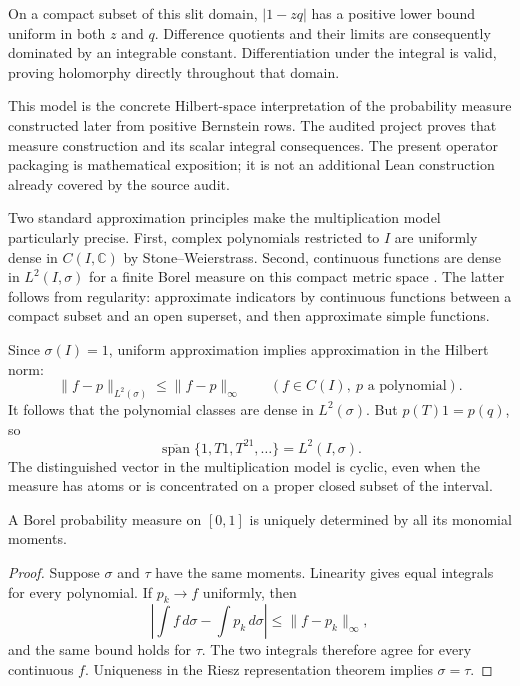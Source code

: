 On a compact subset of this slit domain, $|1-zq|$ has a
positive lower bound uniform in both $z$ and $q$. Difference
quotients and their limits are consequently dominated by an
integrable constant. Differentiation under the integral is valid,
proving holomorphy directly throughout that domain.

This model is the concrete Hilbert-space interpretation of the
probability measure constructed later from positive Bernstein rows.
The audited project proves that measure construction and its scalar
integral consequences. The present operator packaging is mathematical
exposition; it is not an additional Lean construction already covered
by the source audit.

\label{hilb:density}
Two standard approximation principles make the multiplication model
particularly precise. First, complex polynomials restricted to $I$
are uniformly dense in $C(I,\mathbb C)$ by Stone--Weierstrass.
Second, continuous functions are dense in $L^2(I,\sigma)$ for a
finite Borel measure on this compact metric space \cite{rudin}.
The latter follows from regularity: approximate indicators by
continuous functions between a compact subset and an open
superset, and then approximate simple functions.

Since $\sigma(I)=1$, uniform approximation implies approximation
in the Hilbert norm:
\[
 \|f-p\|_{L^2(\sigma)}\le\|f-p\|_\infty
       \qquad(f\in C(I),\ p\text{ a polynomial}).
\]
It follows that the polynomial classes are dense in $L^2(\sigma)$.
But $p(T)1=p(q)$, so
\[
 \overline{\operatorname{span}}\{1,T1,T^21,\ldots\}
     =L^2(I,\sigma).
\]
The distinguished vector in the multiplication model is cyclic,
even when the measure has atoms or is concentrated on a proper
closed subset of the interval.

\begin{proposition}\label{hilb:moment-uniqueness}
A Borel probability measure on $[0,1]$ is uniquely determined by
all its monomial moments.
\end{proposition}
\begin{proof}
Suppose $\sigma$ and $\tau$ have the same moments. Linearity gives
equal integrals for every polynomial. If $p_k\to f$ uniformly, then
\[
 \left|\int f\,d\sigma-\int p_k\,d\sigma\right|
 \le\|f-p_k\|_\infty,
\]
and the same bound holds for $\tau$. The two integrals therefore
agree for every continuous $f$. Uniqueness in the Riesz
representation theorem implies $\sigma=\tau$.
\end{proof}


